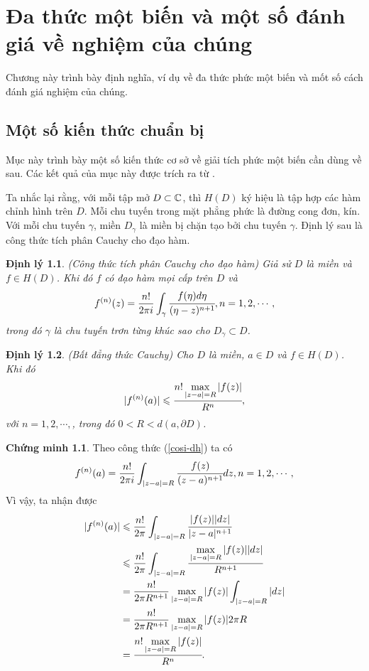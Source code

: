 \documentclass[a5paper,12pt]{report}
\theoremstyle{definition}
\newtheorem*{chungminh}{Chứng minh}
\newtheorem{dinhly}{Định lý}[section]
\newcommand{\cm}{\begin{chungminh}}
\newcommand{\hcm}{\end{chungminh}}
\newcommand{\dl}{\begin{dinhly}\itshape}
\newcommand{\hdl}{\end{dinhly}}
\def\leq{\leqslant}
\numberwithin{equation}{chapter}
\def\vt{\vert}
\def\vt{\vert}
\def\vt{\vert}
\begin{document}
	
	
	
	\chapter{Đa thức một biến và một số đánh giá về nghiệm của chúng }
	\par Chương này trình bày định nghĩa, ví dụ về đa thức phức một biến và mốt số cách đánh giá nghiệm của chúng.
	\section{Một số kiến thức chuẩn bị}
	Mục này trình bày một số kiến thức cơ sở về giải tích phức một biến cần dùng về sau. Các kết quả của mục này được trích ra từ \cite{KH}.
	
	\par Ta nhắc lại rằng, với mỗi tập mở $D\subset \Bbb C$, thì $H(D)$ ký hiệu là tập hợp các hàm chỉnh hình trên $D$.  Mỗi chu tuyến trong mặt phẳng phức là đường cong đơn, kín. Với mỗi chu tuyến $\gamma$, miền $D_\gamma$ là miền bị chặn tạo bởi chu tuyến $\gamma.$ Định lý sau là công thức tích phân Cauchy cho đạo hàm.
	\dl\label{tphc} {\rm (Công thức tích phân Cauchy cho đạo hàm)} Giả sử $D$ là miền và $f\in H(D)$. Khi đó $f$ có đạo hàm mọi cấp trên $D$ và
	\begin{equation}\label{cosi-dh} f^{(n)}(z)=\frac{n!}{2\pi i}\int_\gamma\cfrac{f(\eta) d\eta}{(\eta-z)^{n+1}}, n=1,2,\cdots,
	\end{equation}
	trong đó $\gamma$ là chu tuyến trơn từng khúc sao cho $D_\gamma\subset D$.
	\hdl
	\dl{\rm (Bất đẳng thức Cauchy)} Cho $D$ là miền, $a\in D$ và $f\in H(D)$. Khi đó
	\begin{equation}\label{ch411} \vt f^{(n)}(a)\vt \leq  \cfrac{n! \max\limits_{\vt z-a\vt=R}\vt f(z)\vt}{R^{n}},
	\end{equation}
	với $n=1,2,\cdots,$, trong đó $0<R< d(a, \partial D)$.
	\hdl
	\cm Theo công thức (\ref{cosi-dh}) ta có
	$$f^{(n)}(a)=\frac{n!}{2\pi i}\int_{\vt z-a\vt=R}\cfrac{f(z)}{(z-a)^{n+1}}dz, n=1,2,\cdots,$$
	Vì vậy, ta nhận được
	$$\aligned \vt f^{(n)}(a)\vt  &\leq \frac{n!}{2\pi} \int_{\vt z-a\vt=R}\cfrac{\vt f(z)\vt \vt dz\vt}{\vt z-a\vt^{n+1}}
	\\&\leq \frac{n!}{2\pi} \int_{\vt z-a\vt=R}\cfrac{\max\limits_{\vt z-a\vt=R}\vt f(z)\vt \vt dz\vt}{R^{n+1}}
	\\&=\frac{n!}{2\pi R^{n+1}}\max\limits_{\vt z-a\vt=R}\vt f(z)\vt \int_{\vt z-a\vt=R} \vt dz\vt
	\\&= \frac{n!}{2\pi R^{n+1}}\max\limits_{\vt z-a\vt=R}\vt f(z)\vt 2\pi R
	\\&=  \cfrac{n! \max\limits_{\vt z-a\vt=R}\vt f(z)\vt}{R^{n}}.
	\endaligned $$
	\hcm
	
\end{document}
